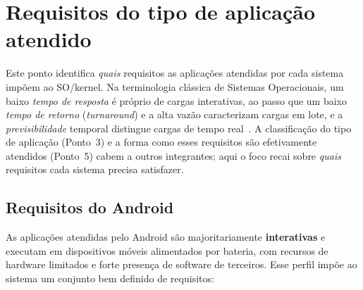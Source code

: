 \documentclass[12pt,a4paper]{article}
\begin{document}
\setcounter{section}{3}
\section{Requisitos do tipo de aplicação atendido}
\label{sec:requisitos}

Este ponto identifica \emph{quais} requisitos as aplicações atendidas por cada
sistema impõem ao SO/kernel. Na terminologia clássica de Sistemas Operacionais,
um baixo \emph{tempo de resposta} é próprio de cargas interativas, ao passo que um
baixo \emph{tempo de retorno} (\emph{turnaround}) e a alta vazão caracterizam
cargas em lote, e a \emph{previsibilidade} temporal distingue cargas de tempo
real~\cite{tanenbaum}. A classificação do tipo de aplicação (Ponto~3) e a forma
como esses requisitos são efetivamente atendidos (Ponto~5) cabem a outros
integrantes; aqui o foco recai sobre \emph{quais} requisitos cada sistema precisa
satisfazer.

\subsection{Requisitos do Android}

As aplicações atendidas pelo Android são majoritariamente \textbf{interativas} e
executam em dispositivos móveis alimentados por bateria, com recursos de hardware
limitados e forte presença de software de terceiros. Esse perfil impõe ao sistema
um conjunto bem definido de requisitos:
\end{document}
